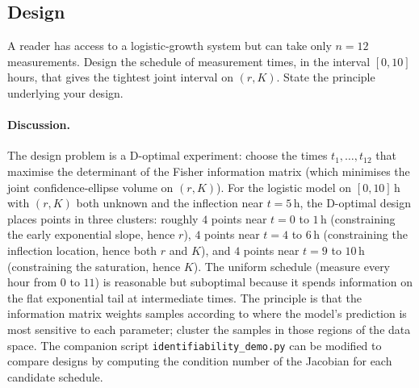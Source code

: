 \subsection*{Design}

\begin{exercise}
A reader has access to a logistic-growth system but can take
only $n = 12$ measurements. Design the schedule of measurement
times, in the interval $[0, 10]$ hours, that gives the
tightest joint interval on $(r, K)$. State the principle
underlying your design.

\paragraph{Discussion.} The design problem is a D-optimal
experiment: choose the times $t_{1}, \ldots, t_{12}$ that
maximise the determinant of the Fisher information matrix (which
minimises the joint confidence-ellipse volume on $(r, K)$). For
the logistic model on $[0, 10]\,\text{h}$ with $(r, K)$ both
unknown and the inflection near $t = 5\,\text{h}$, the
D-optimal design places points in three clusters: roughly $4$
points near $t = 0$ to $1\,\text{h}$ (constraining the early
exponential slope, hence $r$), $4$ points near $t = 4$ to
$6\,\text{h}$ (constraining the inflection location, hence both
$r$ and $K$), and $4$ points near $t = 9$ to $10\,\text{h}$
(constraining the saturation, hence $K$). The uniform schedule
(measure every hour from $0$ to $11$) is reasonable but suboptimal
because it spends information on the flat exponential tail at
intermediate times. The principle is that the information matrix
weights samples according to where the model's prediction is most
sensitive to each parameter; cluster the samples in those regions
of the data space. The companion script
\texttt{identifiability\_demo.py} can be modified to compare
designs by computing the condition number of the Jacobian for
each candidate schedule.
\end{exercise}

